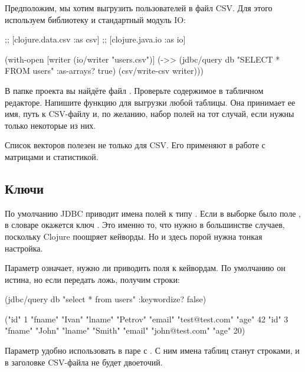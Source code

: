 
Предположим, мы хотим выгрузить пользователей в файл CSV. Для этого используем библиотеку  и стандартный модуль IO:

\begin{english}
  \begin{clojure}
;; [clojure.data.csv :as csv]
;; [clojure.java.io :as io]

(with-open [writer (io/writer "users.csv")]
  (->> (jdbc/query db
                   "SELECT * FROM users"
                   {:as-arrays? true})
       (csv/write-csv writer)))
  \end{clojure}
\end{english}

В папке проекта вы найдёте файл . Проверьте содержимое в табличном редакторе. Напишите функцию для выгрузки любой таблицы. Она принимает ее имя, путь к CSV-файлу и, по желанию, набор полей на тот случай, если нужны только некоторые из них.

Список векторов полезен не только для CSV. Его применяют в работе с матрицами и статистикой.

\subsection{Ключи}


По умолчанию JDBC приводит имена полей к типу . Если в выборке было поле , в словаре окажется ключ . Это именно то, что нужно в большинстве случаев, поскольку Clojure поощряет кейворды. Но и здесь порой нужна тонкая настройка.

Параметр  означает, нужно ли приводить поля к кейвордам. По умолчанию он истина, но если передать ложь, получим строки:

\begin{english}
  \begin{clojure}
(jdbc/query db "select * from users"
               {:keywordize? false})

({"id" 1
  "fname" "Ivan"
  "lname" "Petrov"
  "email" "test@test.com"
  "age" 42}
 {"id" 3
  "fname" "John"
  "lname" "Smith"
  "email" "john@test.com"
  "age" 20})
  \end{clojure}
\end{english}

Параметр удобно использовать в паре с . С ним имена таблиц станут строками, и в заголовке CSV-файла не будет двоеточий.

